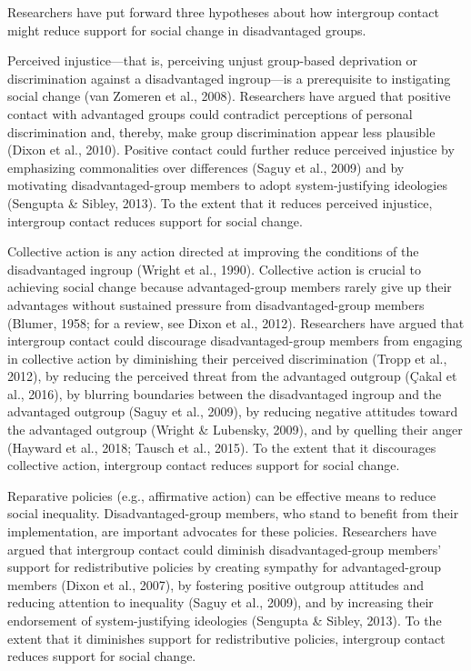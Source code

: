 \documentclass[12pt, letterpaper]{article}
\begin{document}
Researchers have put forward three hypotheses about how intergroup
contact might reduce support for social change in disadvantaged groups.

Perceived injustice---that is, perceiving unjust group-based deprivation
or discrimination against a disadvantaged ingroup---is a prerequisite to
instigating social change (van Zomeren et al., 2008). Researchers have
argued that positive contact with advantaged groups could contradict
perceptions of personal discrimination and, thereby, make group
discrimination appear less plausible (Dixon et al., 2010). Positive
contact could further reduce perceived injustice by emphasizing
commonalities over differences (Saguy et al., 2009) and by motivating
disadvantaged-group members to adopt system-justifying ideologies
(Sengupta \& Sibley, 2013). To the extent that it reduces perceived
injustice, intergroup contact reduces support for social change.

Collective action is any action directed at improving the conditions of
the disadvantaged ingroup (Wright et al., 1990). Collective action is
crucial to achieving social change because advantaged-group members
rarely give up their advantages without sustained pressure from
disadvantaged-group members (Blumer, 1958; for a review, see Dixon et
al., 2012). Researchers have argued that intergroup contact could
discourage disadvantaged-group members from engaging in collective
action by diminishing their perceived discrimination (Tropp et al.,
2012), by reducing the perceived threat from the advantaged outgroup
(Çakal et al., 2016), by blurring boundaries between the disadvantaged
ingroup and the advantaged outgroup (Saguy et al., 2009), by reducing
negative attitudes toward the advantaged outgroup (Wright \& Lubensky,
2009), and by quelling their anger (Hayward et al., 2018; Tausch et al.,
2015). To the extent that it discourages collective action, intergroup
contact reduces support for social change.

Reparative policies (e.g., affirmative action) can be effective means to
reduce social inequality. Disadvantaged-group members, who stand to
benefit from their implementation, are important advocates for these
policies. Researchers have argued that intergroup contact could diminish
disadvantaged-group members' support for redistributive policies by
creating sympathy for advantaged-group members (Dixon et al., 2007), by
fostering positive outgroup attitudes and reducing attention to
inequality (Saguy et al., 2009), and by increasing their endorsement of
system-justifying ideologies (Sengupta \& Sibley, 2013). To the extent
that it diminishes support for redistributive policies, intergroup
contact reduces support for social change.
\end{document}
